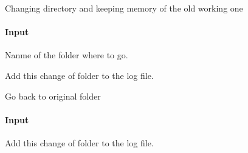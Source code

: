 \documentclass[letterpaper,10pt,english]{sphinxmanual}
\begin{document}
\begin{fulllineitems}
\begin{fulllineitems}
\end{fulllineitems}


\begin{fulllineitems}
\label{\detokenize{api/pymusepipe:pymusepipe.combine.MusePointings.goto_folder}}
\pysigstartsignatures
{}
\pysigstopsignatures
\sphinxAtStartPar
Changing directory and keeping memory of the old working one


\paragraph{Input}
\label{\detokenize{api/pymusepipe:id47}}\begin{description}
\sphinxAtStartPar
Nanme of the folder where to go.

\sphinxAtStartPar
Add this change of folder to the log file.

\end{description}

\end{fulllineitems}


\begin{fulllineitems}
\label{\detokenize{api/pymusepipe:pymusepipe.combine.MusePointings.goto_origfolder}}
\pysigstartsignatures
{}
\pysigstopsignatures
\sphinxAtStartPar
Go back to original folder


\paragraph{Input}
\label{\detokenize{api/pymusepipe:id48}}\begin{description}
\sphinxAtStartPar
Add this change of folder to the log file.

\end{description}


\end{fulllineitems}
\end{fulllineitems}
\end{document}
